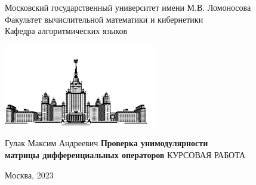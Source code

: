 \thispagestyle{empty}
      \begin{center}  
        Московский государственный университет имени М.В. Ломоносова\\
        Факультет вычислительной математики и кибернетики\\
        Кафедра алгоритмических языков
      \end{center}
      \begin{center}
        \includegraphics[width=0.5\textwidth]{msu.pdf}
      \end{center}
      \begin{center}
        \vfill
        \large{Гулак Максим Андреевич}
        \vfill
        \large{\textbf{Проверка унимодулярности \\матрицы дифференциальных операторов}}
        \vfill
        \large{КУРСОВАЯ РАБОТА}
        \vfill
      \end{center}
      \vfill
      \hfill
      \begin{minipage}{1.0\textwidth}
      \end{minipage}
      \vfill
      \begin{center}
        \large{Москва, 2023}
      \end{center}
      \kern-2cm
